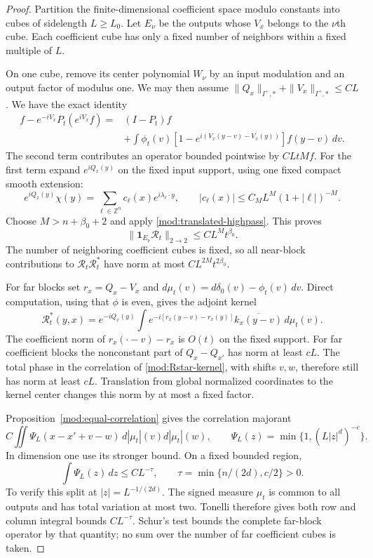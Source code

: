 \documentclass[11pt]{article}
\numberwithin{equation}{section}
\theoremstyle{remark}
\theoremstyle{definition}
\begin{document}
\begin{proof}
Partition the finite-dimensional coefficient space modulo constants into
cubes of sidelength $L\ge L_0$. Let $E_\nu$ be the outputs whose $V_x$
belongs to the $\nu$th cube. Each coefficient cube has only a fixed number
of neighbors within a fixed multiple of $L$.

On one cube, remove its center polynomial $W_\nu$ by an input modulation
and an output factor of modulus one. We may then assume
$\|Q_x\|_{I^+,*}+\|V_x\|_{I^+,*}\le CL$. We have the exact identity
\begin{align*}
 f-e^{-iV_x}P_t(e^{iV_x}f)
 ={}&(I-P_t)f\\
 &+\int\phi_t(v)
 [1-e^{i(V_x(y-v)-V_x(y))}]f(y-v)\,dv.
\end{align*}
The second term contributes an operator bounded pointwise by $CLtMf$.
For the first term expand $e^{iQ_x(y)}$ on the fixed input support, using
one fixed compact smooth extension:
\[
 e^{iQ_x(y)}\chi(y)=\sum_{\ell\in\mathbb Z^n}c_\ell(x)e^{i\lambda_\ell\cdot y},
 \qquad |c_\ell(x)|\le C_M L^M(1+|\ell|)^{-M}.
\]
Choose $M>n+\beta_0+2$ and apply
\eqref{mod:translated-highpass}. This proves
\begin{equation}\label{mod:near-coefficient-block}
 \|\mathbf1_{E_\nu}\mathcal R_t\|_{2\to2}
 \le CL^Mt^{\beta_0}.
\end{equation}
The number of neighboring coefficient cubes is fixed, so all near-block
contributions to $\mathcal R_t\mathcal R_t^*$ have norm at most
$CL^{2M}t^{2\beta_0}$.

For far blocks set $r_x=Q_x-V_x$ and
$d\mu_t(v)=d\delta_0(v)-\phi_t(v)\,dv$. Direct computation, using that
$\phi$ is even, gives the adjoint kernel
\begin{equation}\label{mod:Rstar-kernel}
 \mathcal R_t^*(y,x)
 =e^{-iQ_x(y)}\int
 e^{-i[r_x(y-v)-r_x(y)]}\overline{k_x(y-v)}\,d\mu_t(v).
\end{equation}
The coefficient norm of $r_x(\cdot-v)-r_x$ is $O(t)$ on the fixed
support. For far coefficient blocks the nonconstant part of
$Q_x-Q_{x'}$ has norm at least $cL$. The total phase in the correlation
of \eqref{mod:Rstar-kernel}, with shifts $v,w$, therefore still has norm
at least $cL$. Translation from global normalized coordinates to the
kernel center changes this norm by at most a fixed factor.

Proposition~\ref{mod:equal-correlation} gives the correlation majorant
\[
 C\iint\Psi_L(x-x'+v-w)\,d|\mu_t|(v)d|\mu_t|(w),
 \qquad \Psi_L(z)=\min\{1,(L|z|^d)^{-c}\}.
\]
In dimension one use its stronger bound. On a fixed bounded region,
\[
 \int\Psi_L(z)\,dz\le CL^{-\tau},\qquad
 \tau=\min\{n/(2d),c/2\}>0.
\]
To verify this split at $|z|=L^{-1/(2d)}$. The signed measure $\mu_t$ is
common to all outputs and has total variation at most two. Tonelli
therefore gives both row and column integral bounds $CL^{-\tau}$.
Schur's test bounds the complete far-block operator by that quantity;
no sum over the number of far coefficient cubes is taken.


\end{proof}
\end{document}
